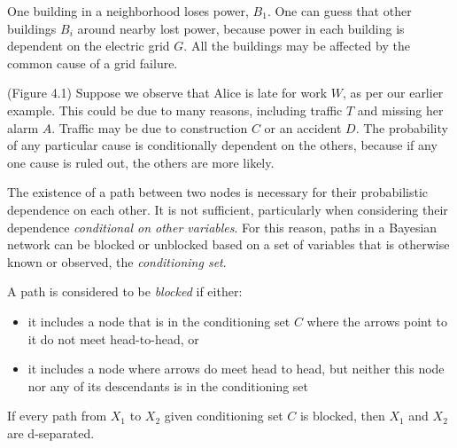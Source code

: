 \documentclass[../thesis.tex]{subfiles}
\begin{document}
\begin{exm}
  One building in a neighborhood loses power, $B_1$.
  One can guess that other buildings $B_i$ around nearby lost power,
  because power in each building is dependent on the electric grid
  $G$. All the buildings may be affected by the common cause of a grid
  failure.
\end{exm}
\begin{center}
\end{center}

\begin{exm}(Figure 4.1) %
  Suppose we observe that Alice is late for work $W$, as per our
  earlier example. This could be due to many reasons,
  including traffic $T$ and missing her alarm $A$.
  Traffic may be due to construction $C$ or an accident $D$.
  The probability of any particular cause is conditionally
  dependent on the others, because if any one cause is
  ruled out, the others are more likely.
\end{exm}

The existence of a path between two nodes is
necessary for their probabilistic dependence on each other.
It is not sufficient, particularly when considering
their dependence \emph{conditional on other variables}.
For this reason, paths in a Bayesian network can be
blocked or unblocked based on a set of variables that is
otherwise known or observed, the \emph{conditioning set}.


\begin{dfn}
A path is considered to be \emph{blocked} if either:
\begin{itemize}
\item it includes a node that is in the conditioning set \(C\) 
where the arrows point to it do not meet head-to-head, or
\item it includes a node where arrows do meet head to head, but
neither this node nor any of its descendants is in the
conditioning set
\end{itemize}
\end{dfn}

\begin{dfn}[D-separation]
If every path from \(X_1\) to \(X_2\) given conditioning set \(C\)
is blocked, then \(X_1\) and \(X_2\) are d-separated.
\end{dfn}
\end{document}

